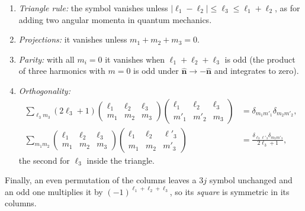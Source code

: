 \begin{enumerate}
  \item \emph{Triangle rule:} the symbol vanishes unless $|\ell_1-\ell_2|\le\ell_3\le\ell_1+\ell_2$, as for adding
        two angular momenta in quantum mechanics.
  \item \emph{Projections:} it vanishes unless $m_1+m_2+m_3=0$.
  \item \emph{Parity:} with all $m_i=0$ it vanishes when $\ell_1+\ell_2+\ell_3$ is odd (the product of three
        harmonics with $m=0$ is odd under $\hat{\bm n}\to-\hat{\bm n}$ and integrates to zero).
  \item \emph{Orthogonality:}
        \begin{align*}
        \sum_{\ell_3m_3}(2\ell_3+1)\begin{pmatrix}\ell_1&\ell_2&\ell_3\\m_1&m_2&m_3\end{pmatrix}
        \begin{pmatrix}\ell_1&\ell_2&\ell_3\\m'_1&m'_2&m_3\end{pmatrix}&=\delta_{m_1m'_1}\delta_{m_2m'_2},\\
        \sum_{m_1m_2}\begin{pmatrix}\ell_1&\ell_2&\ell_3\\m_1&m_2&m_3\end{pmatrix}
        \begin{pmatrix}\ell_1&\ell_2&\ell'_3\\m_1&m_2&m'_3\end{pmatrix}&=\frac{\delta_{\ell_3\ell'_3}\delta_{m_3m'_3}}{2\ell_3+1},
        \end{align*}
        the second for $\ell_3$ inside the triangle.
\end{enumerate}
Finally, an even permutation of the columns leaves a $3j$ symbol unchanged and an odd one
multiplies it by $(-1)^{\ell_1+\ell_2+\ell_3}$, so its \emph{square} is symmetric in its columns.

